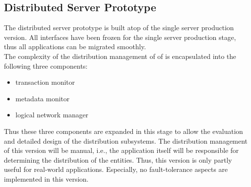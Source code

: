 \documentclass[a4paper, 10pt]{book}
\begin{document}
                                        \subsection{Distributed Server Prototype}
                                        \label{sec:distr-serv-prot}

                                        The distributed server prototype is built atop of the single server
                                        production version. All interfaces have been frozen for the single
                                        server production stage, thus all applications can be migrated
                                        smoothly.\\ 
                                        The complexity of the distribution management of  of \SYNEIGHT is
                                        encapsulated into the following three components: 
                                        \begin{itemize}
                                            \item transaction monitor
                                            \item metadata monitor
                                            \item logical network manager
                                        \end{itemize}
                                        Thus these three components are expanded in this stage to allow the
                                        evaluation and detailed design of the distribution subsystems. The
                                        distribution management of this version will be manual, i.e., the
                                        application itself will be responsible for determining the
                                        distribution of the entities. Thus, this version is only partly useful
                                        for real-world applications. Especially, no fault-tolerance aspects
                                        are implemented in this version. 
\end{document}
